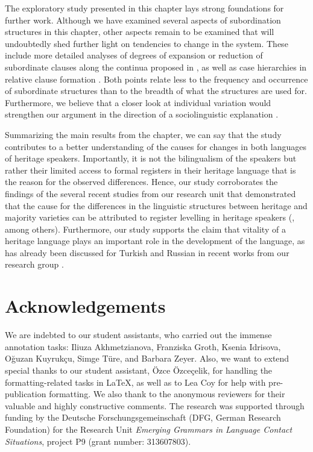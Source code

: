\documentclass[output=paper,colorlinks,citecolor=brown]{langscibook}
\begin{document}
The exploratory study presented in this chapter lays strong foundations for further work.   Although we have examined several aspects of subordination structures in this chapter, other aspects remain to be examined that will undoubtedly shed further light on tendencies to change in the system. These include more detailed analyses of degrees of expansion or reduction of subordinate clauses along the continua proposed in \textcite{lehmann1988towards}, as well as case hierarchies in relative clause formation \parencite{polinsly2008}. Both points relate less to the frequency and occurrence of subordinate structures than to the breadth of what the structures are used for. Furthermore, we believe that a closer look at individual variation would strengthen our argument in the direction of a sociolinguistic explanation \parencite{ozsoy2023exploring}.

Summarizing the main results from the chapter, we can say that the study contributes to a better understanding of the causes for changes in both languages of heritage speakers. Importantly, it is not the bilingualism of the speakers but rather their limited access to formal registers in their heritage language that is the reason for the observed differences. Hence, our study corroborates the findings of the several recent studies from our research unit that demonstrated that the cause for the differences in the linguistic structures between heritage and majority varieties can be attributed to register levelling in heritage speakers 
(\cite{alexiadou2023use,wiese2022heritage,tsehaye2023light,schroeder2022}, among others). Furthermore, our study supports the claim that vitality of a heritage language plays an important role in the development of the language, as has already been discussed for Turkish and Russian in recent works from our research group \parencite{iefremenko2021converbs,schroeder2022,martynova2024use}.

\section*{Acknowledgements}
\label{sec:schroederetal:acknowledgements}

We are indebted to our student assistants, who carried out the immense annotation tasks: Iliuza Akhmetzianova, Franziska Groth, Ksenia Idrisova, Oğuzan Kuyrukçu, Simge Türe, and Barbara Zeyer. Also, we want to extend special thanks to our student assistant, Özce Özceçelik, for handling the formatting\hyp related tasks in \LaTeX, as well as to Lea Coy for help with pre-publication formatting. We also thank to the anonymous reviewers for their valuable and highly constructive comments. The research was supported through funding by the Deutsche Forschungsgemeinschaft (DFG, German Research Foundation) for the Research Unit \textit{Emerging Grammars in Language Contact Situations}, project P9 (grant number: 313607803).
\end{document}
